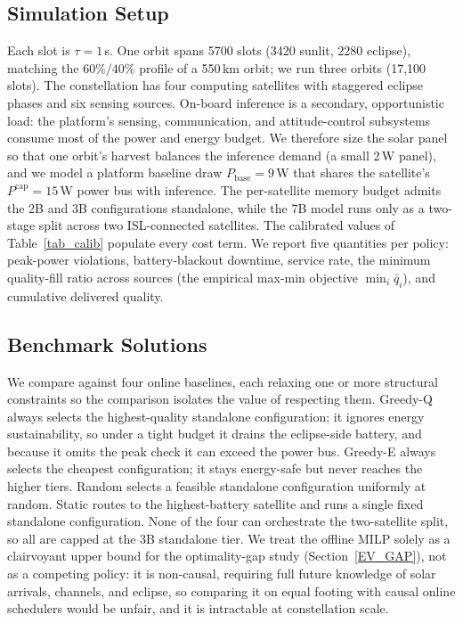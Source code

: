 \subsection{Simulation Setup}\label{EV_SETUP}
Each slot is $\tau=1$\,s. One orbit spans 5700 slots (3420 sunlit, 2280 eclipse), matching the
$60\%/40\%$ profile of a 550\,km orbit; we run three orbits (17{,}100 slots). The constellation has
four computing satellites with staggered eclipse phases and six sensing sources. On-board inference
is a secondary, opportunistic load: the platform's sensing, communication, and attitude-control
subsystems consume most of the power and energy budget. We therefore size the solar panel so that
one orbit's harvest balances the inference demand (a small 2\,W panel), and we model a platform
baseline draw $P_{\text{base}}{=}9$\,W that shares the satellite's $P^{\text{cap}}{=}15$\,W power
bus with inference. The per-satellite memory budget admits the 2B and 3B configurations standalone,
while the 7B model runs only as a two-stage split across two ISL-connected satellites. The
calibrated values of Table~\ref{tab_calib} populate every cost term. We report five quantities per
policy: peak-power violations, battery-blackout downtime, service rate, the minimum quality-fill
ratio across sources (the empirical max-min objective $\min_i \bar{q}_i$), and cumulative delivered
quality.

\subsection{Benchmark Solutions}\label{EV_BASE}
We compare against four online baselines, each relaxing one or more structural constraints so the
comparison isolates the value of respecting them. Greedy-Q always selects the highest-quality
standalone configuration; it ignores energy sustainability, so under a tight budget it drains the
eclipse-side battery, and because it omits the peak check it can exceed the power bus. Greedy-E
always selects the cheapest configuration; it stays energy-safe but never reaches the higher tiers.
Random selects a feasible standalone configuration uniformly at random. Static routes to the
highest-battery satellite and runs a single fixed standalone configuration. None of the four can
orchestrate the two-satellite split, so all are capped at the 3B standalone tier. We treat the
offline MILP solely as a clairvoyant upper bound for the optimality-gap study
(Section~\ref{EV_GAP}), not as a competing policy: it is non-causal, requiring full future
knowledge of solar arrivals, channels, and eclipse, so comparing it on equal footing with causal
online schedulers would be unfair, and it is intractable at constellation scale.


